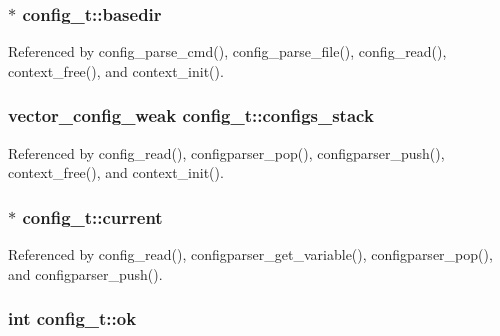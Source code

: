 \hypertarget{structconfig__t_a69fbe5323e638659471f5df92e7b478e}{
\subsubsection[{basedir}]{$\ast$ config\-\_\-t\-::basedir}}\label{structconfig__t_a69fbe5323e638659471f5df92e7b478e}


Referenced by config\-\_\-parse\-\_\-cmd(), config\-\_\-parse\-\_\-file(), config\-\_\-read(), context\-\_\-free(), and context\-\_\-init().

\hypertarget{structconfig__t_ab150672069b689345bc1c38ccc10ad99}{
\subsubsection[{configs\-\_\-stack}]{\setlength{\rightskip}{0pt plus 5cm}vector\-\_\-config\-\_\-weak config\-\_\-t\-::configs\-\_\-stack}}\label{structconfig__t_ab150672069b689345bc1c38ccc10ad99}


Referenced by config\-\_\-read(), configparser\-\_\-pop(), configparser\-\_\-push(), context\-\_\-free(), and context\-\_\-init().

\hypertarget{structconfig__t_a0a6be065c5a9885b55ed452a4120ec02}{
\subsubsection[{current}]{$\ast$ config\-\_\-t\-::current}}\label{structconfig__t_a0a6be065c5a9885b55ed452a4120ec02}


Referenced by config\-\_\-read(), configparser\-\_\-get\-\_\-variable(), configparser\-\_\-pop(), and configparser\-\_\-push().

\hypertarget{structconfig__t_a2207e224465796e696bffaf7e843001d}{
\subsubsection[{ok}]{\setlength{\rightskip}{0pt plus 5cm}int config\-\_\-t\-::ok}}\label{structconfig__t_a2207e224465796e696bffaf7e843001d}


